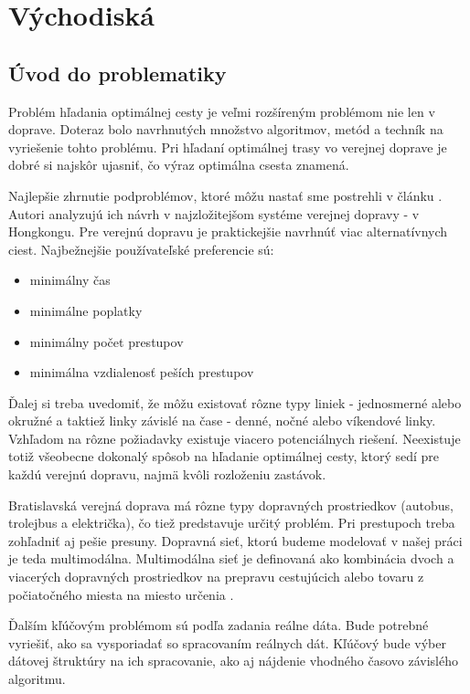 \chapter{Východiská}
\label{kap:vyc} %

\section{Úvod do problematiky}

Problém hľadania optimálnej cesty je veľmi rozšíreným problémom nie len v doprave. Doteraz bolo navrhnutých množstvo algoritmov, metód a techník na vyriešenie tohto problému. Pri hľadaní optimálnej trasy vo verejnej doprave je dobré si najskôr ujasniť, čo  výraz optimálna csesta znamená.

Najlepšie zhrnutie podproblémov, ktoré môžu nastať sme postrehli v článku \cite{circular}. 
Autori analyzujú ich návrh v najzložitejšom systéme verejnej dopravy - v Hongkongu. Pre verejnú dopravu je praktickejšie navrhnúť viac alternatívnych ciest. Najbežnejšie používateľské preferencie sú:
\begin{itemize}
\item{minimálny čas}
\item{minimálne poplatky}
\item{minimálny počet prestupov}
\item{minimálna vzdialenosť peších prestupov}
\end{itemize}
Ďalej si treba uvedomiť, že môžu existovať rôzne typy liniek - jednosmerné alebo okružné a taktiež linky závislé na čase - denné, nočné alebo víkendové linky. Vzhľadom na rôzne požiadavky existuje viacero potenciálnych riešení. Neexistuje totiž všeobecne dokonalý spôsob na hľadanie optimálnej cesty, ktorý sedí pre každú verejnú dopravu, najmä kvôli rozloženiu zastávok.

Bratislavská verejná doprava má rôzne typy dopravných prostriedkov (autobus, trolejbus a električka), čo tiež predstavuje určitý problém. Pri prestupoch treba zohľadniť aj pešie presuny. Dopravná sieť, ktorú budeme modelovať v našej práci je teda multimodálna. Multimodálna sieť je definovaná ako kombinácia dvoch a viacerých dopravných prostriedkov na prepravu cestujúcich alebo tovaru z počiatočného miesta na miesto určenia \cite{timedependent}.

Ďalším kľúčovým problémom sú podľa zadania reálne dáta. Bude potrebné vyriešiť, ako sa vysporiadať so spracovaním reálnych dát. Kľúčový bude výber dátovej štruktúry na ich spracovanie, ako aj nájdenie vhodného časovo závislého algoritmu.

